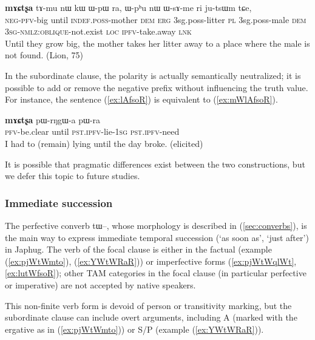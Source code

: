 \documentclass[oldfontcommands,oneside,a4paper,11pt]{article}
\newcommand{\ipa}[1]{{\phon \mbox{#1}}} %
\newcommand{\refb}[1]{(\ref{#1})}
\begin{document}
\begin{exe}
   \ex \label{ex:WsAme}
 \gll
[\ipa{mɯ-tʰɯ-wxti}]   	\textbf{\ipa{mɤɕtʂa}}  	\ipa{tɤ-mu}   	\ipa{nɯ}   	\ipa{kɯ}   	\ipa{ɯ-pɯ}   	\ipa{ra,}   	\ipa{ɯ-pʰu}   	\ipa{nɯ}   	\ipa{ɯ-sɤ-me}   	\ipa{ri}   	\ipa{ju-tsɯm}   	\ipa{tɕe,}   \\
\textsc{neg-pfv}-big until \textsc{indef.poss}-mother \textsc{dem} \textsc{erg}  {3sg.poss}-litter \textsc{pl}  {3sg.poss}-male \textsc{dem} \textsc{3sg-nmlz:oblique}-not.exist  \textsc{loc} \textsc{ipfv}-take.away \textsc{lnk} \\
\glt  Until they grow big, the mother takes her litter away to a place where the male is not found. (Lion, 75)
  \end{exe}
  
In the subordinate clause, the polarity is actually semantically neutralized; it is possible to add or remove the negative prefix without influencing the truth value. For instance, the sentence \refb{ex:lAfsoR} is equivalent to \refb{ex:mWlAfsoR}.

\begin{exe}
\ex \label{ex:lAfsoR}
\gll
[\ipa{lɤ-fsoʁ}]   	\textbf{\ipa{mɤɕtʂa}}   	\ipa{pɯ-rŋgɯ-a}   	\ipa{pɯ-ra}   \\
\textsc{pfv}-be.clear until \textsc{pst.ipfv}-lie-\textsc{1sg} \textsc{pst.ipfv}-need \\
\glt I had to (remain) lying until the day broke. (elicited)
\end{exe}

It is possible that pragmatic differences exist between the two constructions, but we defer this topic to future studies.

\subsubsection{Immediate succession} \label{sec:imm.succession}


The perfective converb \ipa{tɯ--},  whose morphology is described in \refb{sec:converbs}, is the main way to express immediate temporal succession  (`as soon as', `just after') in Japhug.   The verb of the focal clause is either in the factual (example \refb{ex:pjWtWmto}, \refb{ex:YWtWRaR}) or imperfective forms (\ref{ex:pjWtWqlWt}, \ref{ex:lutWfsoR}); other TAM categories in the focal clause (in particular perfective or imperative) are not accepted by native speakers.

This non-finite verb form is devoid of person or transitivity marking, but the subordinate clause can include overt arguments, including A (marked with the ergative as in \refb{ex:pjWtWmto}) or S/P (example \refb{ex:YWtWRaR}). 
\end{document}
